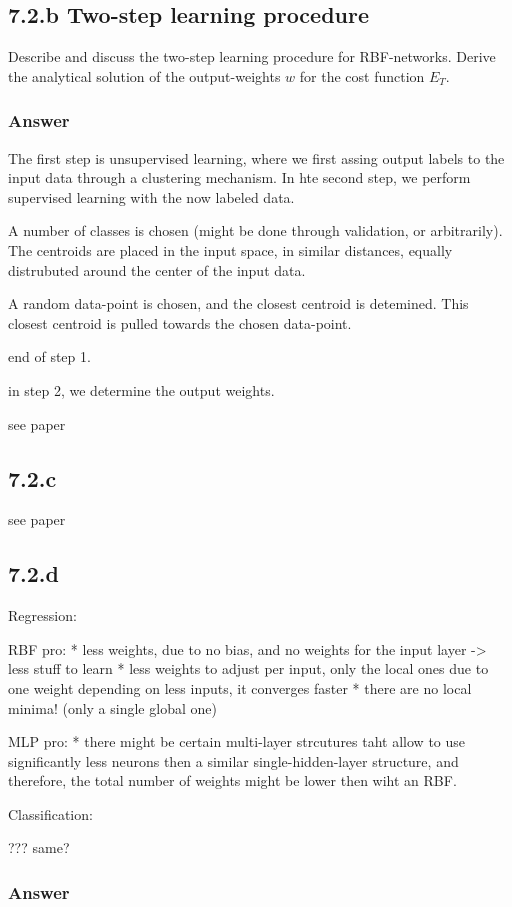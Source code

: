 \documentclass[a4paper,headings=small]{scrartcl}
\begin{document}
\subsection{7.2.b Two-step learning procedure}
Describe and discuss the two-step learning procedure for RBF-networks.
Derive the analytical solution of the output-weights $w$ for the cost function $E_T$.

\subsubsection{Answer}
The first step is unsupervised learning, where we first assing output labels
to the input data through a clustering mechanism.
In hte second step, we perform supervised learning with the now labeled data.


A number of classes is chosen (might be done through validation, or arbitrarily).
The centroids are placed in the input space, in similar distances,
equally distrubuted around the center of the input data.


A random data-point is chosen, and the closest centroid is detemined.
This closest centroid is pulled towards the chosen data-point.

end of step 1.

in step 2, we determine the output weights.



see paper


\subsection{7.2.c}

see paper


\subsection{7.2.d}

Regression:

RBF pro:
* less weights, due to no bias, and no weights for the input layer -> less stuff to learn
* less weights to adjust per input, only the local ones due to one weight depending on less inputs, it converges faster
* there are no local minima! (only a single global one)

MLP pro:
* there might be certain multi-layer strcutures taht allow to use significantly less
neurons then a similar single-hidden-layer structure, and therefore,
the total number of weights might be lower then wiht an RBF.

Classification:

??? same?


\subsubsection{Answer}
\end{document}
